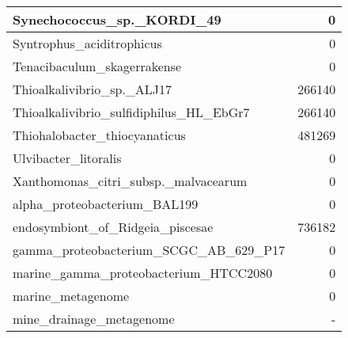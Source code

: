 \documentclass[12pt,a4paper]{article}
\begin{document}
\begin{table}[ht]
\begin{center}
\begin{tabular}{|l*{1}{|r}|}
Synechococcus\_sp.\_KORDI\_49 & 0 \\ \hline
Syntrophus\_aciditrophicus & 0 \\ \hline
Tenacibaculum\_skagerrakense & 0 \\ \hline
Thioalkalivibrio\_sp.\_ALJ17 & 266140 \\ \hline
Thioalkalivibrio\_sulfidiphilus\_HL\_EbGr7 & 266140 \\ \hline
Thiohalobacter\_thiocyanaticus & 481269 \\ \hline
Ulvibacter\_litoralis & 0 \\ \hline
Xanthomonas\_citri\_subsp.\_malvacearum & 0 \\ \hline
alpha\_proteobacterium\_BAL199 & 0 \\ \hline
endosymbiont\_of\_Ridgeia\_piscesae & 736182 \\ \hline
gamma\_proteobacterium\_SCGC\_AB\_629\_P17 & 0 \\ \hline
marine\_gamma\_proteobacterium\_HTCC2080 & 0 \\ \hline
marine\_metagenome & 0 \\ \hline
mine\_drainage\_metagenome & - \\ \hline
\end{tabular}
\end{center}
\end{table}
\end{document}
